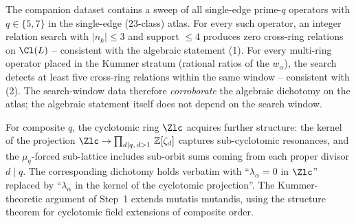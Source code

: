 \begin{remark}\label{rem:D2-search}
The companion dataset \cite{wkb_dataset_v1} contains a sweep of all
single-edge prime-$q$ operators with $q \in \{5, 7\}$ in the
single-edge ($23$-class) atlas. For every such operator, an integer
relation search with $|n_k| \le 3$ and support $\le 4$ produces zero
cross-ring relations on $\Cl(L)$ -- consistent with the algebraic
statement (1). For every multi-ring operator placed in
the Kummer stratum (rational ratios of the $w_\alpha$), the search
detects at least five cross-ring relations within the same window --
consistent with (2). The search-window data therefore
\emph{corroborate} the algebraic dichotomy on the atlas; the algebraic
statement itself does not depend on the search window.
\end{remark}

\begin{remark}[Composite $q$]\label{rem:D2-composite}
For composite $q$, the cyclotomic ring $\Zlc$ acquires further
structure: the kernel of the projection $\Zlc \to \prod_{d \mid q,
\, d > 1}\, \mathbb{Z}[\zeta_d]$ captures sub-cyclotomic resonances,
and the $\mu_q$-forced sub-lattice includes sub-orbit sums coming
from each proper divisor $d \mid q$. The corresponding dichotomy
holds verbatim with ``$\lambda_\alpha = 0$ in $\Zlc$'' replaced by
``$\lambda_\alpha$ in the kernel of the cyclotomic projection''.
The Kummer-theoretic argument of Step~1 extends mutatis mutandis,
using the structure theorem for cyclotomic field extensions of
composite order.
\end{remark}




